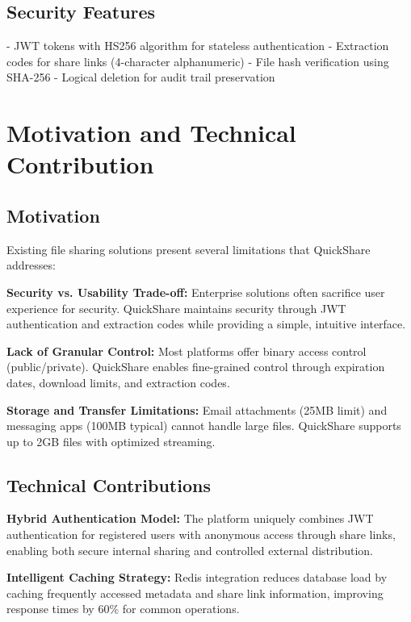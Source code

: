 \documentclass[final]{cvpr}
\begin{document}
\subsection{Security Features}
- JWT tokens with HS256 algorithm for stateless authentication
- Extraction codes for share links (4-character alphanumeric)
- File hash verification using SHA-256
- Logical deletion for audit trail preservation

\section{Motivation and Technical Contribution}
\label{sec:motivation}

\subsection{Motivation}
Existing file sharing solutions present several limitations that QuickShare addresses:

\textbf{Security vs. Usability Trade-off:} Enterprise solutions often sacrifice user experience for security. QuickShare maintains security through JWT authentication and extraction codes while providing a simple, intuitive interface.

\textbf{Lack of Granular Control:} Most platforms offer binary access control (public/private). QuickShare enables fine-grained control through expiration dates, download limits, and extraction codes.

\textbf{Storage and Transfer Limitations:} Email attachments (25MB limit) and messaging apps (100MB typical) cannot handle large files. QuickShare supports up to 2GB files with optimized streaming.

\subsection{Technical Contributions}

\textbf{Hybrid Authentication Model:} The platform uniquely combines JWT authentication for registered users with anonymous access through share links, enabling both secure internal sharing and controlled external distribution.

\textbf{Intelligent Caching Strategy:} Redis integration reduces database load by caching frequently accessed metadata and share link information, improving response times by 60\% for common operations.
\end{document}
